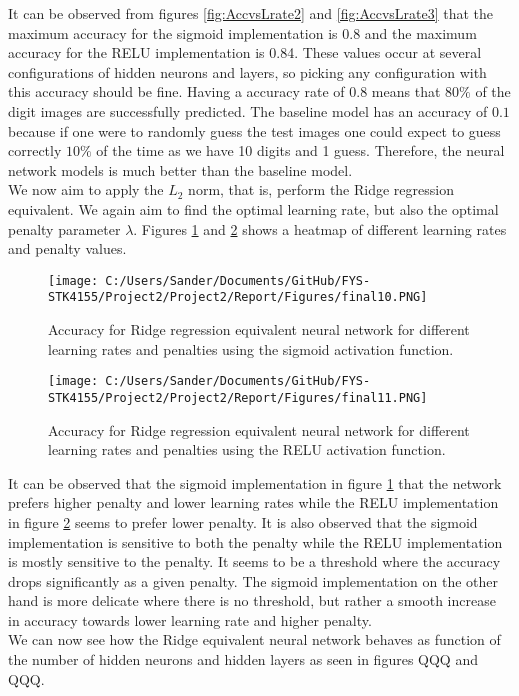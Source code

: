 \documentclass[12pt,a4paper]{article}
\begin{document}
\noindent It can be observed from figures \ref{fig:AccvsLrate2} and \ref{fig:AccvsLrate3} that the maximum accuracy for the sigmoid implementation is 0.8 and the maximum accuracy for the RELU implementation is 0.84. These values occur at several configurations of hidden neurons and layers, so picking any configuration with this accuracy should be fine. Having a accuracy rate of 0.8 means that $80\%$ of the digit images are successfully predicted. The baseline model has an accuracy of $0.1$ because if one were to randomly guess the test images one could expect to guess correctly $10\%$ of the time as we have 10 digits and 1 guess. Therefore, the neural network models is much better than the baseline model.
\\
We now aim to apply the $L_2$ norm, that is, perform the Ridge regression equivalent. We again aim to find the optimal learning rate, but also the optimal penalty parameter $\lambda$. Figures \ref{fig:AccvsLrate4} and \ref{fig:AccvsLrate5} shows a heatmap of different learning rates and penalty values.

\begin{figure}[H]
\centering
\texttt{[image: C:/Users/Sander/Documents/GitHub/FYS-STK4155/Project2/Project2/Report/Figures/final10.PNG]}
\caption{\label{fig:AccvsLrate4} Accuracy for Ridge regression equivalent neural network for different learning rates and penalties using the sigmoid activation function.}
\end{figure}

\begin{figure}[H]
\centering
\texttt{[image: C:/Users/Sander/Documents/GitHub/FYS-STK4155/Project2/Project2/Report/Figures/final11.PNG]}
\caption{\label{fig:AccvsLrate5} Accuracy for Ridge regression equivalent neural network for different learning rates and penalties using the RELU activation function.}
\end{figure}

\noindent It can be observed that the sigmoid implementation in figure \ref{fig:AccvsLrate4} that the network prefers higher penalty and lower learning rates while the RELU implementation in figure \ref{fig:AccvsLrate5} seems to prefer lower penalty. It is also observed that the sigmoid implementation is sensitive to both the penalty while the RELU implementation is mostly sensitive to the penalty. It seems to be a threshold where the accuracy drops significantly as a given penalty. The sigmoid implementation on the other hand is more delicate where there is no threshold, but rather a smooth increase in accuracy towards lower learning rate and higher penalty.
\\
We can now see how the Ridge equivalent neural network behaves as function of the number of hidden neurons and hidden layers as seen in figures QQQ and QQQ.
\end{document}
